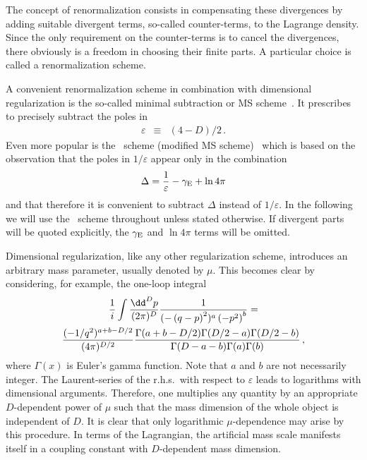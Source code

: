 The concept of renormalization consists in compensating these
divergences by adding suitable divergent terms, so-called counter-terms,
to the Lagrange density. Since the only requirement on
the counter-terms is to cancel the divergences, there obviously is a
freedom in choosing their finite parts. A particular choice is called
a renormalization scheme.

A convenient renormalization scheme in combination with dimensional
regularization is the so-called minimal subtraction or
MS scheme~\cite{tHo73}.  It prescribes to precisely subtract the poles in
\begin{eqnarray}
\varepsilon &\equiv& (4-D)/2\,.
\end{eqnarray}
Even more popular is the
\msbar~scheme (modified MS scheme)~\cite{BarBurDukMut78} which is
based on the observation that the poles in $1/\varepsilon$
appear only in the combination
\begin{equation}
\Delta = {1\over \varepsilon} - \gamma_{\rm E} + \ln 4\pi
\end{equation}
and that therefore it is convenient to subtract $\Delta$ instead of
$1/\varepsilon$. In the following we will use the \msbar~scheme throughout
unless stated otherwise. If divergent parts will be quoted explicitly,
the $\gamma_{\rm E}$ and $\ln 4\pi$ terms will be omitted.

Dimensional regularization, like any other regularization
scheme, introduces an arbitrary mass parameter, usually denoted
by $\mu$. This becomes clear by considering, for example, the
one-loop integral
\begin{multline}
  \frac{1}{i}\int {\dd^Dp\over (2\pi)^D} 
  {1\over  (-\left(q-p\right)^2)^a 
           \left(-p^2\right)^b} = \\
           {(-1/q^2)^{a+b-D/2}\over (4\pi)^{D/2}}
  \frac{\Gamma(a+b-D/2)\Gamma(D/2-a)\Gamma(D/2-b)}
       {\Gamma(D-a-b)\Gamma(a)\Gamma(b)}
\,,
\label{eqml1loop}
\end{multline}
where $\Gamma(x)$ is Euler's gamma function. Note that $a$
and $b$ are not necessarily integer.
The Laurent-series of the r.h.s.\ with respect to $\varepsilon$
leads to logarithms with dimensional arguments. Therefore, one multiplies
any quantity by an appropriate $D$-dependent power of $\mu$ such that
the mass dimension of the whole object is independent of $D$. It is clear
that only logarithmic $\mu$-dependence may arise by this procedure.
In terms of the Lagrangian, the artificial mass scale manifests itself
in a coupling constant with $D$-dependent mass dimension.

